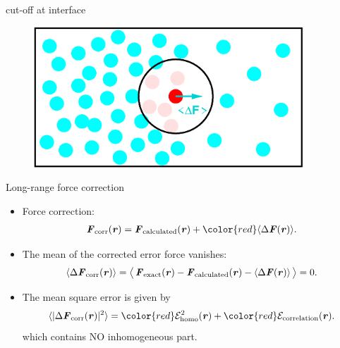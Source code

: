 \documentclass{beamer}
\newcommand{\redc}[1]{{\color{red} #1}}
\newcommand{\bluec}[1]{{\color{blue} #1}}
\newcommand{\vect}[1]{\textbf{\textit{#1}}}
\begin{document}
\begin{frame}{cut-off at interface}
  \begin{figure}
    \centering
    \includegraphics[width=0.9\textwidth]{figs/t0.85-n16000-rc07.5uni/cut-interface-step05.eps}
  \end{figure}  
\end{frame}

\begin{frame}{Long-range force correction}
  \begin{itemize}\itemsep -10pt
  \item<1-> Force correction:
    \bluec{
      \begin{align*}
        \vect F_{\textrm{corr}}(\vect r) =
        {\vect F}_{\textrm{calculated}}(\vect r) +
        \redc{\langle\Delta\vect F(\vect r)\rangle}.
      \end{align*}}
  \item<2->   The mean of
    the corrected error force vanishes:
    \bluec{
      \begin{align*}
        \langle\Delta\vect F_{\textrm{corr}}(\vect r)\rangle
        =
        \big\langle\,
        \vect F_{\textrm{exact}}(\vect r) - {\vect F}_{\textrm{calculated}}(\vect r) - \langle\Delta\vect F(\vect r)\rangle\,
        \big\rangle = 0.
      \end{align*}}
  \item<3-> The mean square error is given by
    \bluec{
      \begin{align*} \nonumber
        \langle\vert\Delta\vect F_{\textrm{corr}}(\vect r)\vert^2\rangle
        =
        \redc{\mathcal E^2_{\textrm{homo}}(\vect r)} +
        \redc{\mathcal E_{\textrm{correlation}}(\vect r)}.
      \end{align*}}
    which contains \redc{NO} inhomogeneous part.
  \end{itemize}
\end{frame}
\end{document}
